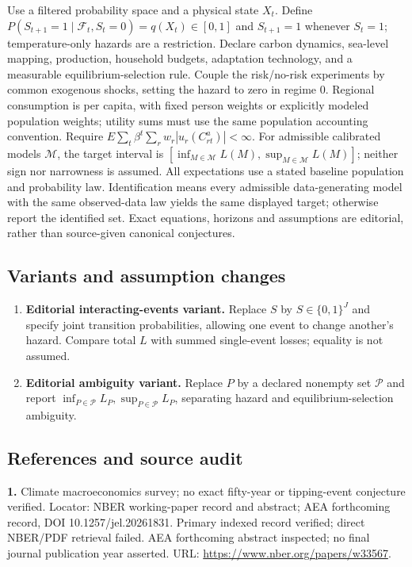 \documentclass[11pt,a4paper]{article}
\begin{document}
Use a filtered probability space and a physical state \(X_t\). Define \(P(S_{t+1}=1\mid\mathcal F_t,S_t=0)=q(X_t)\in[0,1]\) and \(S_{t+1}=1\) whenever \(S_t=1\); temperature-only hazards are a restriction. Declare carbon dynamics, sea-level mapping, production, household budgets, adaptation technology, and a measurable equilibrium-selection rule. Couple the risk/no-risk experiments by common exogenous shocks, setting the hazard to zero in regime 0. Regional consumption is per capita, with fixed person weights or explicitly modeled population weights; utility sums must use the same population accounting convention. Require \(E\sum_t\beta^t\sum_r w_r|u_r(C_{rt}^a)|<\infty\). For admissible calibrated models \(\mathcal M\), the target interval is \([\inf_{M\in\mathcal M}L(M),\sup_{M\in\mathcal M}L(M)]\); neither sign nor narrowness is assumed. All expectations use a stated baseline population and probability law. Identification means every admissible data-generating model with the same observed-data law yields the same displayed target; otherwise report the identified set. Exact equations, horizons and assumptions are editorial, rather than source-given canonical conjectures.
\subsection*{Variants and assumption changes}
\begin{enumerate}
\item \textbf{Editorial interacting-events variant.} Replace \(S\) by \(S\in\{0,1\}^J\) and specify joint transition probabilities, allowing one event to change another's hazard. Compare total \(L\) with summed single-event losses; equality is not assumed.
\item \textbf{Editorial ambiguity variant.} Replace \(P\) by a declared nonempty set \(\mathcal P\) and report \(\inf_{P\in\mathcal P}L_P,\sup_{P\in\mathcal P}L_P\), separating hazard and equilibrium-selection ambiguity.
\end{enumerate}
\subsection*{References and source audit}
\textbf{1.} Climate macroeconomics survey; no exact fifty-year or tipping-event conjecture verified. Locator: NBER working-paper record and abstract; AEA forthcoming record, DOI 10.1257/jel.20261831. Primary indexed record verified; direct NBER/PDF retrieval failed. AEA forthcoming abstract inspected; no final journal publication year asserted. URL: \url{https://www.nber.org/papers/w33567}.
\end{document}
